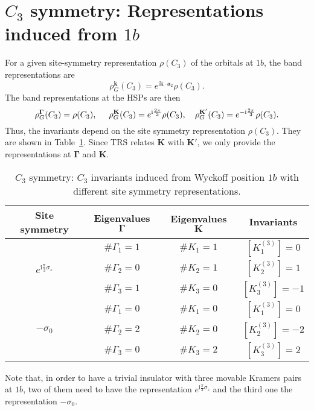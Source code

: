{\section{$C_3$ symmetry: Representations induced from $1b$}
For a given site-symmetry representation $\rho(C_3)$ of the orbitals at $1b$, the band representations are
\begin{equation}
\rho_G^{\mathbf{k}}(C_3)= e^{\mathrm{i} {\mathbf{k}} \cdot \mathbf{a}_2} \rho(C_3).
\end{equation}
The band representations at the HSPs are then
\begin{equation*}
\rho_G^{\mathbf{\Gamma}}(C_3)=\rho(C_3), \hspace{0.5cm} \rho_G^{\mathbf{K}}(C_3)=e^{\mathrm{i} \frac{2\pi}{3}}\rho(C_3), \quad \rho_G^{\mathbf{K}'}(C_3)=e^{-\mathrm{i} \frac{2\pi}{3}}\rho(C_3).
\end{equation*}
Thus, the invariants depend on the site symmetry representation $\rho(C_3)$. 
They are shown in Table~\ref{tab:C3_inducedC3InvariantsFrom1b}. Since TRS relates ${\mathbf{K}}$ with ${\mathbf{K}'}$, we only provide the representations at $\mathbf{\Gamma}$ and ${\mathbf{K}}$.
\begin{table}[h]
	\centering
	\begin{tabular}{|c|c|c|c|}
		\hline 
		Site symmetry & Eigenvalues ${\mathbf{\Gamma}}$ & Eigenvalues ${\mathbf{K}}$ & Invariants\\
		\hline\hline
		& $\#\Gamma_1=1$ & $\#K_1=1$ & $[K_1^{(3)}]=0$ \\
		$e^{\mathrm{i}\frac{\pi}{3}\sigma_z}$ & $\#\Gamma_2=0$ & $\#K_2=1$ & $[K_2^{(3)}]=1$ \\
		 & $\#\Gamma_3=1$ & $\#K_3=0$ & $[K_3^{(3)}]=-1$\\
		\hline
		& $\#\Gamma_1=0$ & $\#K_1=0$ & $[K_1^{(3)}]=0$ \\
		$-\sigma_0$ & $\#\Gamma_2=2$ & $\#K_2=0$ & $[K_2^{(3)}]=-2$ \\
		 & $\#\Gamma_3=0$ & $\#K_3=2$ & $[K_3^{(3)}]=2$\\
		\hline
	\end{tabular} 
	\caption[$C_3$ symmetry: $C_3$ invariants induced from Wyckoff position $1b$ with different site symmetry representations]{$C_3$ symmetry: $C_3$ invariants induced from Wyckoff position $1b$ with different site symmetry representations.}
	\label{tab:C3_inducedC3InvariantsFrom1b}
\end{table}
Note that, in order to have a trivial insulator with three movable Kramers pairs at $1b$, two of them need to have the representation $e^{\mathrm{i}\frac{\pi}{3}\sigma_z}$ and the third one the representation $-\sigma_0$.

}
